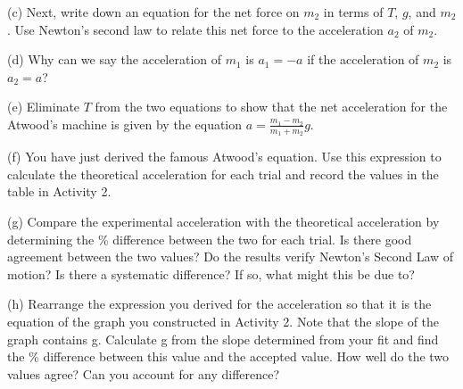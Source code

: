 (c) Next, write down an equation for the net force on \( m_{2} \) in terms
of $T$, $g$, and \( m_{2} \). Use Newton's second law to relate this net force
to the acceleration \( a_{2} \) of \( m_{2} \). 
\vspace{20mm}

(d) Why can we say the acceleration of \( m_{1} \) is \( a_{1} = -a\) if
the acceleration of \( m_{2} \) is \( a_{2} = a\)?
\vspace{20mm}

(e) Eliminate $T$ from the two equations to show that the net acceleration for
the Atwood's machine is given by the equation \( \displaystyle a=\frac{m_{1}-m_{2}}{m_{1}+m_{2}}g \). 
\vspace{40mm}

(f) You have just derived the famous Atwood's equation. Use this expression
to calculate the theoretical acceleration for each trial and record the values
in the table in Activity 2.

(g) Compare the experimental acceleration with the theoretical acceleration
by determining the \% difference between the two for each trial. Is there good
agreement between the two values? Do the results verify Newton's Second Law
of motion? Is there a systematic difference? If so, what might this be due to?
\vspace{20mm}

(h) Rearrange the expression you derived for the acceleration so that it is
the equation of the graph you constructed in Activity 2. Note that the slope
of the graph contains g. Calculate g from the slope determined from your fit
and find the \% difference between this value and the accepted value. How well
do the two values agree? Can you account for any difference?

